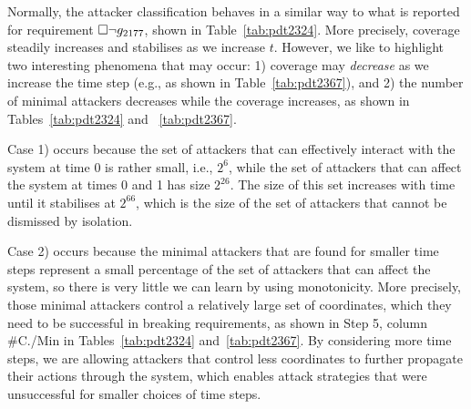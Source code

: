 {Normally, the attacker classification behaves in a similar way to what is reported for requirement $ {{\square}} \lnot g_{2177}$, shown in Table~\ref{tab:pdt2324}. More precisely, coverage steadily increases and stabilises as we increase $t$. However, we like to highlight two interesting phenomena that may occur: 1) coverage {may} \emph{decrease} as we increase the time step (e.g., as shown in Table~\ref{tab:pdt2367}), and 2) the number of minimal attackers decreases while the coverage increases, as shown in Tables~\ref{tab:pdt2324} and ~\ref{tab:pdt2367}. 


Case 1) occurs because the set of attackers that can effectively interact with the system at time 0 is rather small, i.e., $2^6$, while the set of attackers that can affect the system at times 0 and 1 has size $2^{26}$. The size of this set increases with time until it stabilises at $2^{66}$, which is the size of the set of attackers that cannot be dismissed by isolation. 

Case 2) occurs because the minimal attackers that are found for smaller time steps represent a small percentage of the set of attackers that can affect the system, so there is very little we can learn by using monotonicity. More precisely, those minimal attackers control a relatively large set of coordinates, which they need to be successful in breaking requirements, as shown in Step 5, column \#C./Min in Tables~\ref{tab:pdt2324} and~\ref{tab:pdt2367}. By considering more time steps, we are allowing attackers that control less coordinates to further propagate their actions through the system, which enables attack strategies that were unsuccessful for smaller choices of time steps.

}
